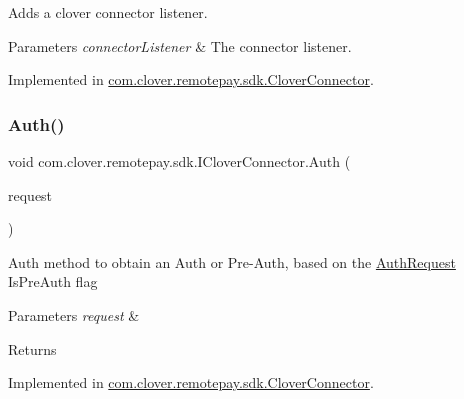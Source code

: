 Adds a clover connector listener. 


\begin{DoxyParams}{Parameters}
{\em connector\+Listener} & The connector listener.\\
\hline
\end{DoxyParams}


Implemented in \hyperlink{classcom_1_1clover_1_1remotepay_1_1sdk_1_1_clover_connector_aebd32d30edf2691cafd56d8540597d9a}{com.\+clover.\+remotepay.\+sdk.\+Clover\+Connector}.

\mbox{\label{interfacecom_1_1clover_1_1remotepay_1_1sdk_1_1_i_clover_connector_af0099cbd3075f3c91f6873265f9c766b}} 
\subsubsection{\texorpdfstring{Auth()}{Auth()}}
{\footnotesize\ttfamily void com.\+clover.\+remotepay.\+sdk.\+I\+Clover\+Connector.\+Auth (\begin{DoxyParamCaption}\item[{\hyperlink{classcom_1_1clover_1_1remotepay_1_1sdk_1_1_auth_request}{Auth\+Request}}]{request }\end{DoxyParamCaption})}



Auth method to obtain an Auth or Pre-\/\+Auth, based on the \hyperlink{classcom_1_1clover_1_1remotepay_1_1sdk_1_1_auth_request}{Auth\+Request} Is\+Pre\+Auth flag 


\begin{DoxyParams}{Parameters}
{\em request} & \\
\hline
\end{DoxyParams}
\begin{DoxyReturn}{Returns}

\end{DoxyReturn}


Implemented in \hyperlink{classcom_1_1clover_1_1remotepay_1_1sdk_1_1_clover_connector_a2ae641aff3f22e4c5fa651d8deaa7bbd}{com.\+clover.\+remotepay.\+sdk.\+Clover\+Connector}.

\mbox{\label{interfacecom_1_1clover_1_1remotepay_1_1sdk_1_1_i_clover_connector_abbb999130d903a88e806c7b396c743f7}} 
